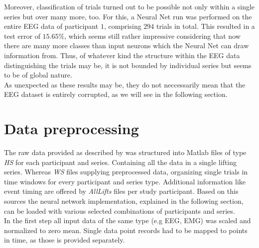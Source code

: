 \documentclass{article} %
\begin{document}
Moreover, classification of trials turned out to be possible not only within a single series but over many more, too. For this, a Neural Net run was performed on the entire EEG data of participant $1$, comprising $294$ trials in total. This resulted in a test error of $15.65\%$, which seems still rather impressive considering that now there are many more classes than input neurons which the Neural Net can draw information from.
Thus, of whatever kind the structure within the EEG data distinguishing the trials may be, it is not bounded by individual series but seems to be of global nature.\\
As unexpected as these results may be, they do not neccessarily mean that the EEG dataset is entirely corrupted, as we will see in the following section.


\section{Data preprocessing}
The raw data provided as described by \citep{nature} was structured into Matlab files of type \textit{HS} for each participant and series. Containing all the data in a single lifting series. Whereas \textit{WS} files supplying preprocessed data, organizing single trials in time windows for every participant and series type. Additional information like event timing are offered by \textit{AllLifts} files per study participant. Based on this sources the neural network implementation, explained in the following section, can be loaded with various selected combinations of participants and series.\\ In the first step all input data of the same type (e.g EEG, EMG) was scaled and normalized to zero mean. Single data point records had to be mapped to points in time, as those is provided separately.\\
\end{document}

